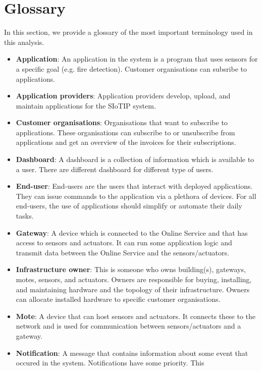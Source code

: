 \documentclass[english]{sareport}
\begin{document}
\newpage
\section{Glossary}
In this section, we provide a glossary of the most important terminology used
in this analysis.

\begin{itemize}
    \item \textbf{Application}: An application in the system is a program that
    uses sensors for a specific goal (e.g. fire detection). Customer organisations
    can subsribe to applications.
    \item \textbf{Application providers}: Application providers develop, upload,
    and maintain applications for the SIoTIP system.
    \item \textbf{Customer organisations}: Organisations that want to subscribe
    to applications. These organisations can subscribe to or unsubscribe from
    applications and get an overview of the invoices for their subscriptions.
    \item \textbf{Dashboard}: A dashboard is a collection of information which is
    available to a user. There are different dashboard for different type of users.
    \item \textbf{End-user}: End-users are the users that interact with deployed
    applications. They can issue commands to the application via a plethora of
    devices. For all end-users, the use of applications should simplify or
    automate their daily tasks.
    \item \textbf{Gateway}: A device which is connected to the Online Service
    and that has access to sensors and actuators. It can run some application
    logic and transmit data between the Online Service and the sensors/actuators.
    \item \textbf{Infrastructure owner}: This is someone who owns building(s),
    gateways, motes, sensors, and actuators. Owners are responsible for buying,
    installing, and maintaining hardware and the topology of their infrastructure.
    Owners can allocate installed hardware to specific customer organisations.
    \item \textbf{Mote}: A device that can host sensors and actuators. It connects
    these to the network and is used for communication between sensors/actuators
    and a gateway.
    \item \textbf{Notification}: A message that contains information about some
    event that occured in the system. Notifications have some priority. This

\end{itemize}
\end{document}
